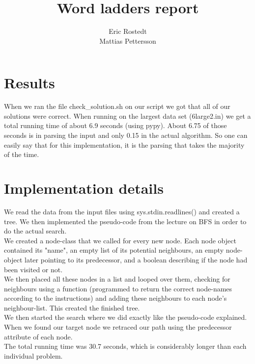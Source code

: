 \documentclass{article}
\title{Word ladders report}
\author{Eric Rostedt \\ Mattias Pettersson}
\begin{document}
\maketitle

\section{Results}

When we ran the file check\_solution.sh on our script we got that all of our solutions were correct. When running on the largest data set (6large2.in) we get a total running time of about 6.9 seconds (using pypy). About 6.75 of those seconds is in parsing the input and only 0.15 in the actual algorithm. So one can easily say that for this implementation, it is the parsing that takes the majority of the time. 

\section{Implementation details}

We read the data from the input files using sys.stdin.readlines() and created a tree. We then implemented the pseudo-code from the lecture on BFS in order to do the actual search. \\

We created a node-class that we called for every new node. Each node object contained its "name", an empty list of its potential neighbours, an empty node-object later pointing to its predecessor, and a boolean describing if the node had been visited or not.\\

We then placed all these nodes in a list and looped over them, checking for neighbours using a function (programmed to return the correct node-names according to the instructions) and adding these neighbours to each node's neighbour-list. This created the finished tree.\\

We then started the search where we did exactly like the pseudo-code explained. When we found our target node we retraced our path using the predecessor attribute of each node. \\

The total running time was 30.7 seconds, which is considerably longer than each individual problem.\\
\end{document}
